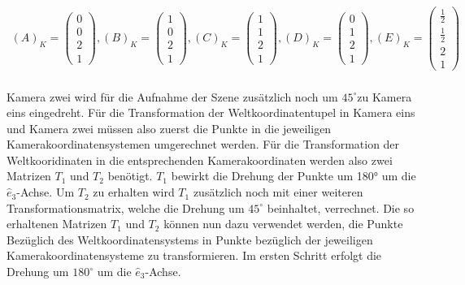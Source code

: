 \begin{gather}
(A)_K=\begin{pmatrix}
0\\0\\2\\1
\end{pmatrix}, 
(B)_K=
\begin{pmatrix}
1\\0\\2\\1
\end{pmatrix},
(C)_K=
\begin{pmatrix}
1\\1\\2\\1
\end{pmatrix},
(D)_K=
\begin{pmatrix}
0\\1\\2\\1
\end{pmatrix},
(E)_K=
\begin{pmatrix}
\frac{1}{2}\\\frac{1}{2}\\2\\1
\end{pmatrix}
\end{gather}\\

Kamera zwei wird für die Aufnahme der Szene zusätzlich noch um \ensuremath{45^\circ}zu Kamera eins eingedreht.
Für die Transformation der Weltkoordinatentupel in Kamera eins und Kamera zwei müssen also zuerst die Punkte in die jeweiligen Kamerakoordinatensystemen umgerechnet werden. Für die Transformation der Weltkooridinaten in die entsprechenden Kamerakoordinaten werden also zwei Matrizen \ensuremath{T_1} und \ensuremath{T_2} benötigt. \ensuremath{T_1} bewirkt die Drehung der Punkte um 180° um die \ensuremath{\hat{e}_3}-Achse. Um \ensuremath{T_2} zu erhalten wird \ensuremath{T_1} zusätzlich noch mit einer weiteren Transformationsmatrix, welche die Drehung um \ensuremath{45^\circ} beinhaltet, verrechnet. Die so erhaltenen Matrizen \ensuremath{T_1} und \ensuremath{T_2} können nun dazu verwendet werden, die Punkte Bezüglich des Weltkoordinatensystems in Punkte bezüglich der jeweiligen Kamerakoordinatensysteme zu transformieren. Im ersten Schritt erfolgt die Drehung um \ensuremath{180^\circ} um die \ensuremath{\hat{e}_3}-Achse.


